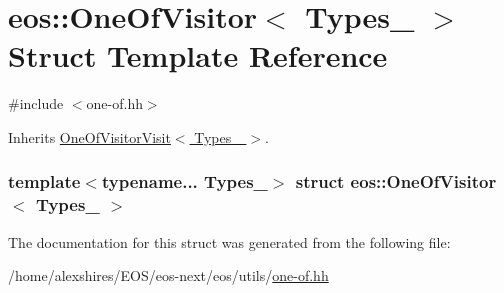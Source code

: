 \hypertarget{structeos_1_1OneOfVisitor}{
\section{eos::OneOfVisitor$<$ Types\_\- $>$ Struct Template Reference}
\label{structeos_1_1OneOfVisitor}
}


{\ttfamily \#include $<$one-\/of.hh$>$}

Inherits \hyperlink{structeos_1_1OneOfVisitorVisit}{OneOfVisitorVisit$<$ Types\_\- $>$}.\subsubsection*{template$<$typename... Types\_\-$>$ struct eos::OneOfVisitor$<$ Types\_\- $>$}



The documentation for this struct was generated from the following file:\begin{DoxyCompactItemize}
\item 
/home/alexshires/EOS/eos-\/next/eos/utils/\hyperlink{one-of_8hh}{one-\/of.hh}\end{DoxyCompactItemize}
